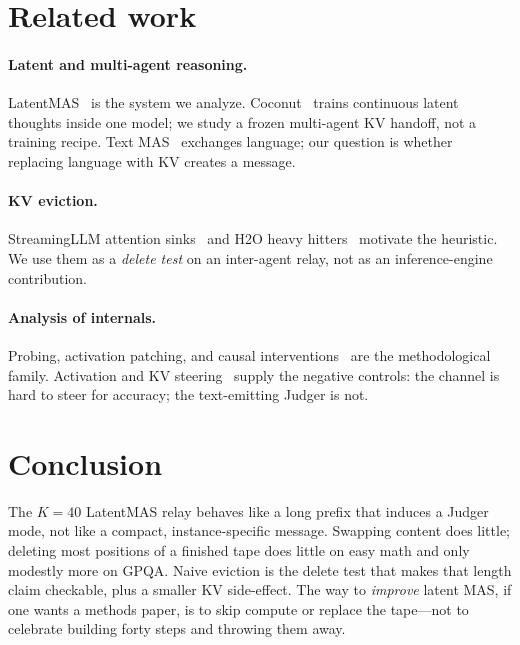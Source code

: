 \documentclass[11pt]{article}
\begin{document}
\section{Related work}
\label{sec:related}

\paragraph{Latent and multi-agent reasoning.}
LatentMAS~\citep{zou2025latentmas} is the system we analyze.
Coconut~\citep{hao2024coconut} trains continuous latent thoughts inside
one model; we study a frozen multi-agent KV handoff, not a training
recipe. Text MAS~\citep{du2023society,wu2023autogen} exchanges language;
our question is whether replacing language with KV creates a message.

\paragraph{KV eviction.}
StreamingLLM attention sinks~\citep{xiao2024streamingllm} and
H2O heavy hitters~\citep{zhang2023h2o} motivate the heuristic. We use
them as a \emph{delete test} on an inter-agent relay, not as an
inference-engine contribution.

\paragraph{Analysis of internals.}
Probing, activation patching, and causal
interventions~\citep{belinkov2019analysis,meng2022rome,geva2023lm} are
the methodological family. Activation and KV
steering~\citep{turner2023actadd,rimsky2024caa,chen2025seal,li2025kvsteer}
supply the negative controls: the channel is hard to steer for
accuracy; the text-emitting Judger is not.

\section{Conclusion}
The $K{=}40$ LatentMAS relay behaves like a long prefix that induces a
Judger mode, not like a compact, instance-specific message. Swapping
content does little; deleting most positions of a finished tape does
little on easy math and only modestly more on GPQA. Naive eviction is
the delete test that makes that length claim checkable, plus a smaller
KV side-effect. The way to \emph{improve} latent MAS, if one wants a
methods paper, is to skip compute or replace the tape---not to celebrate
building forty steps and throwing them away.
\end{document}
